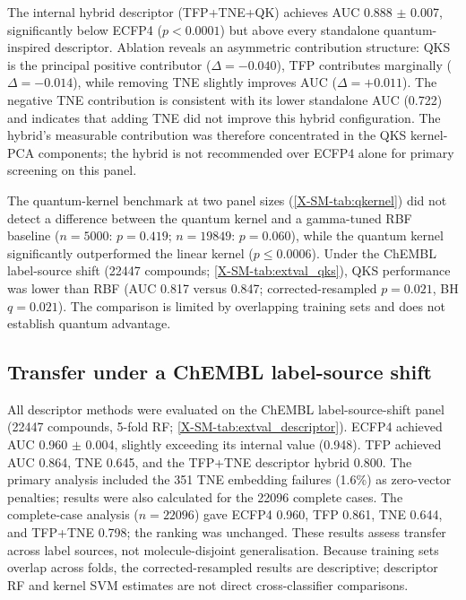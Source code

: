 \documentclass[11pt,a4paper]{article}
\begin{document}
The internal hybrid descriptor (TFP+TNE+QK) achieves AUC \num{0.888} $\pm$ \num{0.007}, significantly below ECFP4 ($p < \num{0.0001}$) but above every standalone quantum-inspired descriptor. Ablation reveals an asymmetric contribution structure: QKS is the principal positive contributor ($\Delta = -\num{0.040}$), TFP contributes marginally ($\Delta = -\num{0.014}$), while removing TNE slightly improves AUC ($\Delta = +\num{0.011}$). The negative TNE contribution is consistent with its lower standalone AUC (\num{0.722}) and indicates that adding TNE did not improve this hybrid configuration. The hybrid's measurable contribution was therefore concentrated in the QKS kernel-PCA components; the hybrid is not recommended over ECFP4 alone for primary screening on this panel.

The quantum-kernel benchmark at two panel sizes (\cref{X-SM-tab:qkernel}) did not detect a difference between the quantum kernel and a gamma-tuned RBF baseline ($n = \num{5000}$: $p = \num{0.419}$; $n = \num{19849}$: $p = \num{0.060}$), while the quantum kernel significantly outperformed the linear kernel ($p \leq \num{0.0006}$). Under the ChEMBL label-source shift (\num{22447} compounds; \cref{X-SM-tab:extval_qks}), QKS performance was lower than RBF (AUC \num{0.817} versus \num{0.847}; corrected-resampled $p = \num{0.021}$, BH $q = \num{0.021}$). The comparison is limited by overlapping training sets and does not establish quantum advantage.

\subsection{Transfer under a ChEMBL label-source shift}

All descriptor methods were evaluated on the ChEMBL label-source-shift panel (\num{22447} compounds, 5-fold RF; \cref{X-SM-tab:extval_descriptor}). ECFP4 achieved AUC \num{0.960} $\pm$ \num{0.004}, slightly exceeding its internal value (\num{0.948}). TFP achieved AUC \num{0.864}, TNE \num{0.645}, and the TFP+TNE descriptor hybrid \num{0.800}. The primary analysis included the \num{351} TNE embedding failures (\num{1.6}\%) as zero-vector penalties; results were also calculated for the \num{22096} complete cases. The complete-case analysis ($n = \num{22096}$) gave ECFP4 \num{0.960}, TFP \num{0.861}, TNE \num{0.644}, and TFP+TNE \num{0.798}; the ranking was unchanged. These results assess transfer across label sources, not molecule-disjoint generalisation. Because training sets overlap across folds, the corrected-resampled results are descriptive; descriptor RF and kernel SVM estimates are not direct cross-classifier comparisons.
\end{document}
